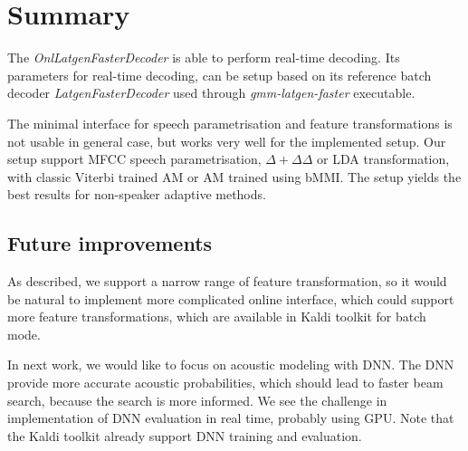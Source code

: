 \section{Summary}
\label{sec:onl_summary}
The {\it OnlLatgenFasterDecoder}\/ is able to perform real-time decoding.
Its parameters for real-time decoding, 
can be setup based on its reference batch decoder {\it LatgenFasterDecoder}\/ used through {\it gmm-latgen-faster}\/ executable.

The minimal interface for speech parametrisation and feature transformations is not usable in general case,
but works very well for the implemented setup.
Our setup support \ac{MFCC} speech parametrisation, $\Delta+\Delta\Delta$ or \ac{LDA} transformation, with
classic Viterbi trained \ac{AM} or \ac{AM} trained using \ac{bMMI}.
The setup yields the best results for non-speaker adaptive methods.

\subsection{Future improvements}
\label{sub:onl_future}
As described, we support a narrow range of feature transformation,
so it would be natural to implement more complicated online interface,
which could support more feature transformations, 
which are available in Kaldi toolkit for batch mode. 

In next work, we would like to focus on acoustic modeling with \acl{DNN}.
The \ac{DNN} provide more accurate acoustic probabilities, 
which should lead to faster beam search,
because the search is more informed.\cite{TODO_DNN} 
We see the challenge in implementation of \acl{DNN} evaluation in real time, probably using \ac{GPU}.
Note that the Kaldi toolkit already support \ac{DNN} training and evaluation.
